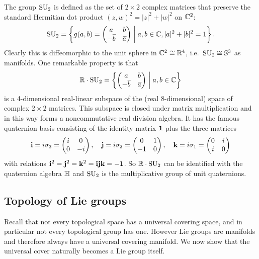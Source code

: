 \begin{example}
    The group $\SU_2$ is defined as the set of $2\times2$ complex matrices that preserve the standard Hermitian dot product $(z,w)^2=|z|^2+|w|^2$ on $\bbC^2$:
    \[\SU_2=\left\{g(a,b)=
    \begin{pmatrix}
        a&b\\-\wb{b}&\wb{a}
    \end{pmatrix}
    \middle| a,b\in\bbC, |a|^2+|b|^2=1
    \right\}.\]
    Clearly this is diffeomorphic to the unit sphere in $\bbC^2\cong \bbR^4$, i.e.~$\SU_2\cong \bbS^3$ as manifolds. One remarkable property is that 
    \[\bbR\cdot \SU_2=\left\{
    \begin{pmatrix}
        a&b\\-\wb{b}&\wb{a}
    \end{pmatrix}
    \middle| a,b\in\bbC
    \right\}\]
    is a 4-dimensional real-linear subspace of the (real 8-dimensional) space of complex $2\times 2$ matrices. This subspace is closed under matrix multiplication and in this way forms a noncommutative real division algebra. It has the famous quaternion basis consisting of the identity matrix $\bf{1}$ plus the three matrices
    \[\bf{i}=i\sigma_3=\begin{pmatrix}
        i&0\\0&-i
    \end{pmatrix},\quad 
    \bf{j}=i\sigma_2=\begin{pmatrix}
        0&1\\-1&0
    \end{pmatrix},\quad
    \bf{k}=i\sigma_1=\begin{pmatrix}
        0&i\\i&0
    \end{pmatrix}\]
    with relations $\bf{i}^2=\bf{j}^2=\bf{k}^2=\bf{ijk}=-\bf{1}$. So $\bbR\cdot\SU_2$ can be identified with the quaternion algebra $\bbH$ and $\SU_2$ is the multiplicative group of unit quaternions.
\end{example}










\subsection{Topology of Lie groups}

Recall that not every topological space has a universal covering space, and in particular not every topological group has one. However Lie groups are manifolds and therefore always have a universal covering manifold. We now show that the universal cover naturally becomes a Lie group itself.

